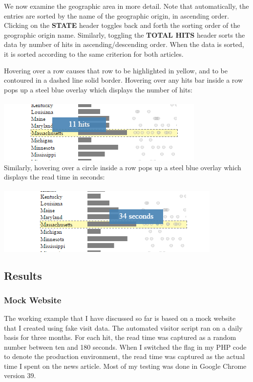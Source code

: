 \documentclass[12pt]{article}
\begin{document}
{\noindent We now examine the geographic area in more detail. Note that automatically, the entries are sorted by the name of the geographic origin, in ascending order. Clicking on the \textbf{STATE} header toggles back and forth the sorting order of the geographic origin name. Similarly, toggling the \textbf{TOTAL HITS} header sorts the data by number of hits in ascending/descending order. When the data is sorted, it is sorted according to the same criterion for both articles. 

\newpage

\noindent Hovering over a row causes that row to be highlighted in yellow, and to be contoured in a dashed line solid border. Hovering over any hits bar inside a row pops up a steel blue overlay which displays the number of hits:
\\ \\
\noindent\includegraphics[scale=0.8]{img/state_hit_hover} \\  

\noindent Similarly, hovering over a circle inside a row pops up a steel blue overlay which displays the read time in seconds:
\\ \\
\noindent\includegraphics[scale=0.8]{img/state_circle_hover} \\ 


\newpage

\subsection{Results}

\subsubsection{Mock Website}
The working example that I have discussed so far is based on a mock website that I created using fake visit data. The automated visitor script ran on a daily basis for three months. For each hit, the read time was captured as a random number between ten and 180 seconds. When I switched the flag in my PHP code to denote the production environment, the read time was captured as the actual time I spent on the news article. Most of my testing was done in Google Chrome version 39.  

}
\end{document}

